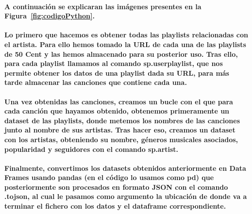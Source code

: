 \documentclass[11pt,spanish]{article}
\begin{document}
\paragraph*{A continuación se explicaran las imágenes presentes en la Figura~\ref{fig:codigoPython}.}


\paragraph*{Lo primero que hacemos es obtener todas las playlists relacionadas con el artista. Para ello hemos tomado la URL de cada una de las playlists de 50 Cent y las hemos almacenado para su posterior uso. 
Tras ello, para cada playlist llamamos al comando sp.user\textunderscore playlist, que nos permite obtener los datos de una playlist dada su URL, para más tarde almacenar las canciones que contiene cada una.}

\paragraph*{Una vez obtenidas las canciones, creamos un bucle con el que para cada canción que hayamos obtenido, obtenemos primeramente un dataset de las playlists, donde metemos los nombres de las canciones junto al nombre de sus artistas. 
Tras hacer eso, creamos un dataset con los artistas, obteniendo su nombre, géneros musicales asociados, popularidad y seguidores con el comando sp.artist. }

\paragraph*{Finalmente, convertimos los datasets obtenidos anteriormente en Data Frames usando pandas (en el código lo usamos como pd) que posteriormente son procesados en formato JSON con el comando .to\textunderscore json, al cual le pasamos como argumento la ubicación de donde va a terminar el fichero con los datos y el dataframe correspondiente. }
\end{document}
